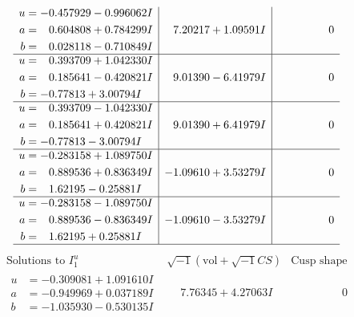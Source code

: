 \documentclass[1p]{elsarticle_modified}
\theoremstyle{definition}
\newcommand{\I}{\sqrt{-1}}
\begin{document}
$$\begin{array}{c|c|c}
\begin{aligned}
u &= -0.457929 - 0.996062 I \\
a &= \phantom{-}0.604808 + 0.784299 I \\
b &= \phantom{-}0.028118 - 0.710849 I\end{aligned}
 & \phantom{-}7.20217 + 1.09591 I & \phantom{-0.000000 } 0 \\ \hline\begin{aligned}
u &= \phantom{-}0.393709 + 1.042330 I \\
a &= \phantom{-}0.185641 - 0.420821 I \\
b &= -0.77813 + 3.00794 I\end{aligned}
 & \phantom{-}9.01390 - 6.41979 I & \phantom{-0.000000 } 0 \\ \hline\begin{aligned}
u &= \phantom{-}0.393709 - 1.042330 I \\
a &= \phantom{-}0.185641 + 0.420821 I \\
b &= -0.77813 - 3.00794 I\end{aligned}
 & \phantom{-}9.01390 + 6.41979 I & \phantom{-0.000000 } 0 \\ \hline\begin{aligned}
u &= -0.283158 + 1.089750 I \\
a &= \phantom{-}0.889536 + 0.836349 I \\
b &= \phantom{-}1.62195 - 0.25881 I\end{aligned}
 & -1.09610 + 3.53279 I & \phantom{-0.000000 } 0 \\ \hline\begin{aligned}
u &= -0.283158 - 1.089750 I \\
a &= \phantom{-}0.889536 - 0.836349 I \\
b &= \phantom{-}1.62195 + 0.25881 I\end{aligned}
 & -1.09610 - 3.53279 I & \phantom{-0.000000 } 0\\
 \hline 
 \end{array}$$\newpage$$\begin{array}{c|c|c}  
\text{Solutions to }I^u_{1}& \I (\text{vol} + \sqrt{-1}CS) & \text{Cusp shape}\\
 \hline 
\begin{aligned}
u &= -0.309081 + 1.091610 I \\
a &= -0.949969 + 0.037189 I \\
b &= -1.035930 - 0.530135 I\end{aligned}
 & \phantom{-}7.76345 + 4.27063 I & \phantom{-0.000000 } 0 \\ \hline\begin{aligned}

\end{aligned}
\end{array}$$
\end{document}
